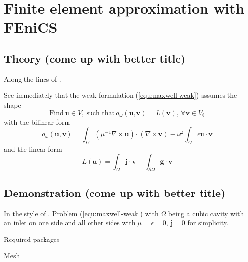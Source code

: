 \documentclass[11pt, a4paper]{article}
\begin{document}


\newpage
\section{Finite element approximation with FEniCS}
\label{sec:fem}

\subsection{Theory (come up with better title)}
\label{subsec:fem-theory}


Along the lines of \cite{fenics}.

See immediately that the weak formulation (\ref{equ:maxwell-weak}) assumes the shape
\begin{equation}
    \text{Find}~\mathbf{u} \in V,~\text{such that}~a_{\omega}(\mathbf{u}, \mathbf{v}) = L(\mathbf{v}), ~\forall \mathbf{v} \in V_0
\end{equation}
with the bilinear form 
\begin{equation}
    a_{\omega}(\mathbf{u}, \mathbf{v}) = \int_{\Omega} (\mu^{-1} \nabla \times \mathbf{u}) \cdot (\nabla \times \mathbf{v})
    - \omega^2 \int_{\Omega} \epsilon \mathbf{u} \cdot \mathbf{v}
\end{equation}
and the linear form 
\begin{equation}
    L(\mathbf{u}) = \int_{\Omega} \mathbf{j} \cdot \mathbf{v} + \int_{\partial \Omega} \mathbf{g} \cdot \mathbf{v}
\end{equation}


\subsection{Demonstration (come up with better title)}
\label{subsec:fem-demo}

In the style of \cite{fenics}. 
Problem (\ref{equ:maxwell-weak}) with $\Omega$ being a cubic cavity with an inlet
on one side and all other sides with $\mu = \epsilon = 0$, $\mathbf{j} = 0$
for simplicity.

Required packages


Mesh

\end{document}
